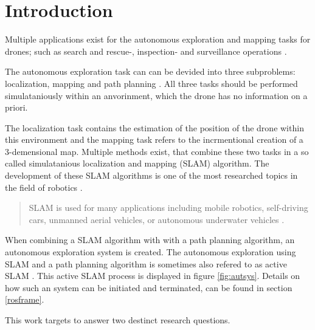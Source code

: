 \chapter{Introduction}

Multiple applications exist for the autonomous exploration and mapping tasks for drones;
 such as search and rescue-, inspection- and surveillance operations \cite{usecases}. 
 
 The autonomous exploration task can can be devided into three subproblems: localization, mapping and path planning \cite{accurat}. 
 All three tasks should be performed simulataniously within an anvorinment, which the drone has no information on a priori. 
 
 The localization task contains the estimation of the position of the drone within this environment and the mapping task refers to 
 the incrmentional creation of a 3-demensional map. Multiple methods exist, that combine these two tasks in a so called 
 simulatanious localization and mapping (SLAM) algorithm. The development of these SLAM algorithms is one of the most researched topics 
in the field of robotics \cite{slamintro}.

\begin{quote}
SLAM is used for many applications including mobile robotics, self-driving cars, unmanned
aerial vehicles, or autonomous underwater vehicles \cite{quote1}.
\end{quote}

 When combining a SLAM algorithm with with a path planning algorithm, an autonomous exploration 
system is created. The autonomous exploration using SLAM and a path planning algorithm is sometimes also refered to as active SLAM \cite{inproceedings}. 
This active SLAM process is displayed in figure \ref{fig:autsys}. Details on how such an system can be initiated and terminated, can be found in section 
\ref{rosframe}.
 
 
This work targets to answer two destinct research questions. 
 
